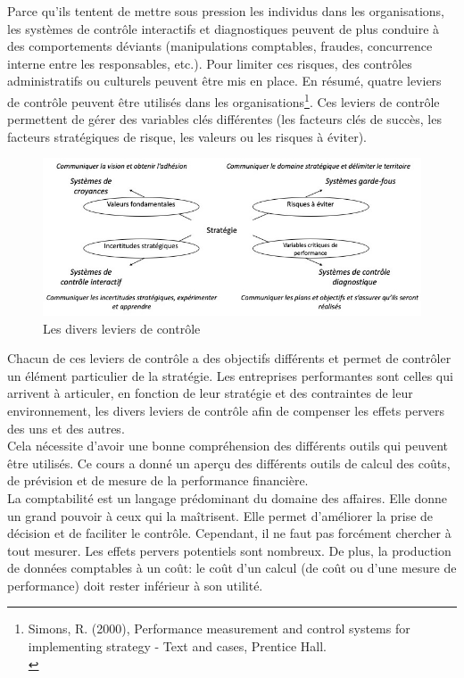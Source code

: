 \documentclass{kaobook}
\begin{document}
Parce qu'ils tentent de mettre sous pression les individus dans les organisations, les systèmes de contrôle interactifs et diagnostiques peuvent de plus conduire à des comportements déviants (manipulations comptables, fraudes, concurrence interne entre les responsables, etc.). Pour limiter ces risques, des contrôles administratifs ou culturels peuvent être mis en place. En résumé, quatre leviers de contrôle peuvent être utilisés dans les organisations\footnote{Simons, R. (2000), Performance measurement and control systems for implementing strategy - Text and cases, Prentice Hall.\\}. Ces leviers de contrôle permettent de gérer des variables clés différentes (les facteurs clés de succès, les facteurs stratégiques de risque, les valeurs ou les risques à éviter).\\

\begin{figure}[htbp]
\centering
\includegraphics[width=.9\linewidth]{./img/levers.jpeg}
\caption{Les divers leviers de contrôle}
\end{figure}

Chacun de ces leviers de contrôle a des objectifs différents et permet de contrôler un élément particulier de la stratégie. Les entreprises performantes sont celles qui arrivent à articuler, en fonction de leur stratégie et des contraintes de leur environnement, les divers leviers de contrôle afin de compenser les effets pervers des uns et des autres.\\

Cela nécessite d'avoir une bonne compréhension des différents outils qui peuvent être utilisés. Ce cours a donné un aperçu des différents outils de calcul des coûts, de prévision et de mesure de la performance financière.\\

La comptabilité est un langage prédominant du domaine des affaires. Elle donne un grand pouvoir à ceux qui la maîtrisent. Elle permet d'améliorer la prise de décision et de faciliter le contrôle. Cependant, il ne faut pas forcément chercher à tout mesurer. Les effets pervers potentiels sont nombreux. De plus, la production de données comptables à un coût: le coût d’un calcul (de coût ou d'une mesure de performance) doit rester inférieur à son utilité.\\
\end{document}
